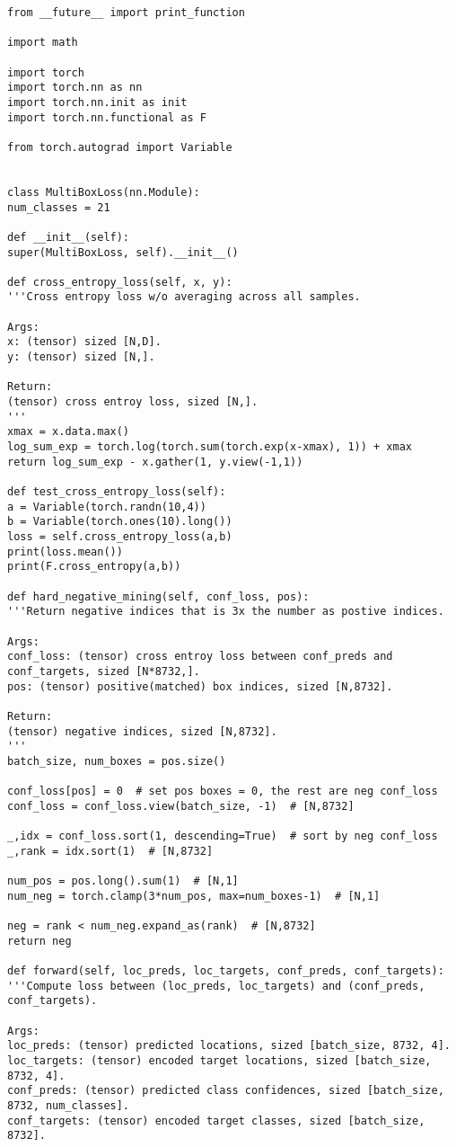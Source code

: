 \begin{lstlisting}[caption={损失函数}]
from __future__ import print_function

import math

import torch
import torch.nn as nn
import torch.nn.init as init
import torch.nn.functional as F

from torch.autograd import Variable


class MultiBoxLoss(nn.Module):
num_classes = 21

def __init__(self):
super(MultiBoxLoss, self).__init__()

def cross_entropy_loss(self, x, y):
'''Cross entropy loss w/o averaging across all samples.

Args:
x: (tensor) sized [N,D].
y: (tensor) sized [N,].

Return:
(tensor) cross entroy loss, sized [N,].
'''
xmax = x.data.max()
log_sum_exp = torch.log(torch.sum(torch.exp(x-xmax), 1)) + xmax
return log_sum_exp - x.gather(1, y.view(-1,1))

def test_cross_entropy_loss(self):
a = Variable(torch.randn(10,4))
b = Variable(torch.ones(10).long())
loss = self.cross_entropy_loss(a,b)
print(loss.mean())
print(F.cross_entropy(a,b))

def hard_negative_mining(self, conf_loss, pos):
'''Return negative indices that is 3x the number as postive indices.

Args:
conf_loss: (tensor) cross entroy loss between conf_preds and conf_targets, sized [N*8732,].
pos: (tensor) positive(matched) box indices, sized [N,8732].

Return:
(tensor) negative indices, sized [N,8732].
'''
batch_size, num_boxes = pos.size()

conf_loss[pos] = 0  # set pos boxes = 0, the rest are neg conf_loss
conf_loss = conf_loss.view(batch_size, -1)  # [N,8732]

_,idx = conf_loss.sort(1, descending=True)  # sort by neg conf_loss
_,rank = idx.sort(1)  # [N,8732]

num_pos = pos.long().sum(1)  # [N,1]
num_neg = torch.clamp(3*num_pos, max=num_boxes-1)  # [N,1]

neg = rank < num_neg.expand_as(rank)  # [N,8732]
return neg

def forward(self, loc_preds, loc_targets, conf_preds, conf_targets):
'''Compute loss between (loc_preds, loc_targets) and (conf_preds, conf_targets).

Args:
loc_preds: (tensor) predicted locations, sized [batch_size, 8732, 4].
loc_targets: (tensor) encoded target locations, sized [batch_size, 8732, 4].
conf_preds: (tensor) predicted class confidences, sized [batch_size, 8732, num_classes].
conf_targets: (tensor) encoded target classes, sized [batch_size, 8732].


\end{lstlisting}
